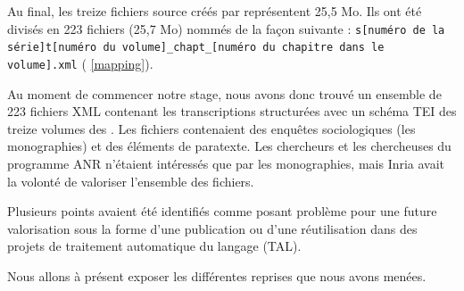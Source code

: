 Au final, les treize fichiers source créés par \lse{} représentent 25,5 Mo. Ils ont été divisés en 223 fichiers (25,7 Mo) nommés de la façon suivante : \texttt{s[numéro de la série]t[numéro du volume]\_chapt\_[numéro du chapitre dans le volume].xml} (\ann{} \ref{mapping}).

\clearpage


Au moment de commencer notre stage, nous avons donc trouvé un ensemble de 223 fichiers XML contenant les transcriptions structurées avec un schéma TEI des treize volumes des \odm. Les fichiers contenaient des enquêtes sociologiques (les monographies) et des éléments de paratexte. Les chercheurs et les chercheuses du programme ANR \timeus{} n'étaient intéressés que par les monographies, mais Inria avait la volonté de valoriser l'ensemble des fichiers.

Plusieurs points avaient été identifiés comme posant problème pour une future valorisation sous la forme d'une publication ou d'une réutilisation dans des projets de traitement automatique du langage (TAL).

Nous allons à présent exposer les différentes reprises que nous avons menées.
